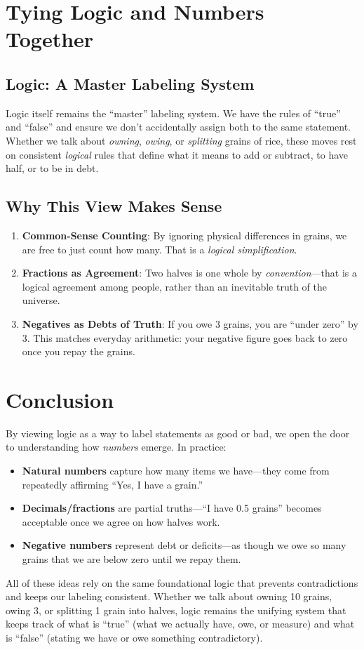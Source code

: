 \documentclass[12pt]{article}
\begin{document}
\section{Tying Logic and Numbers Together}

\subsection{Logic: A Master Labeling System}
Logic itself remains the ``master'' labeling system. We have the rules of
``true'' and ``false'' and ensure we don't accidentally assign both to
the same statement. Whether we talk about \emph{owning}, \emph{owing},
or \emph{splitting} grains of rice, these moves rest on consistent
\emph{logical} rules that define what it means to add or subtract,
to have half, or to be in debt.

\subsection{Why This View Makes Sense}
\begin{enumerate}
  \item \textbf{Common-Sense Counting}: By ignoring physical differences in
  grains, we are free to just count how many. That is a \emph{logical
  simplification}.
  \item \textbf{Fractions as Agreement}: Two halves is one whole by
  \emph{convention}---that is a logical agreement among people, rather than
  an inevitable truth of the universe.
  \item \textbf{Negatives as Debts of Truth}: If you owe 3 grains, you are
  ``under zero'' by 3. This matches everyday arithmetic: your negative
  figure goes back to zero once you repay the grains.
\end{enumerate}

\section{Conclusion}
By viewing logic as a way to label statements as good or bad, we open
the door to understanding how \emph{numbers} emerge. In practice:
\begin{itemize}
  \item \textbf{Natural numbers} capture how many items we have---they
  come from repeatedly affirming ``Yes, I have a grain.''
  \item \textbf{Decimals/fractions} are partial truths---``I have 0.5
  grains'' becomes acceptable once we agree on how halves work.
  \item \textbf{Negative numbers} represent debt or deficits---as though
  we owe so many grains that we are below zero until we repay them.
\end{itemize}
All of these ideas rely on the same foundational logic that prevents
contradictions and keeps our labeling consistent. Whether we talk about
owning 10 grains, owing 3, or splitting 1 grain into halves, logic
remains the unifying system that keeps track of what is ``true''
(what we actually have, owe, or measure) and what is ``false''
(stating we have or owe something contradictory).
\end{document}
